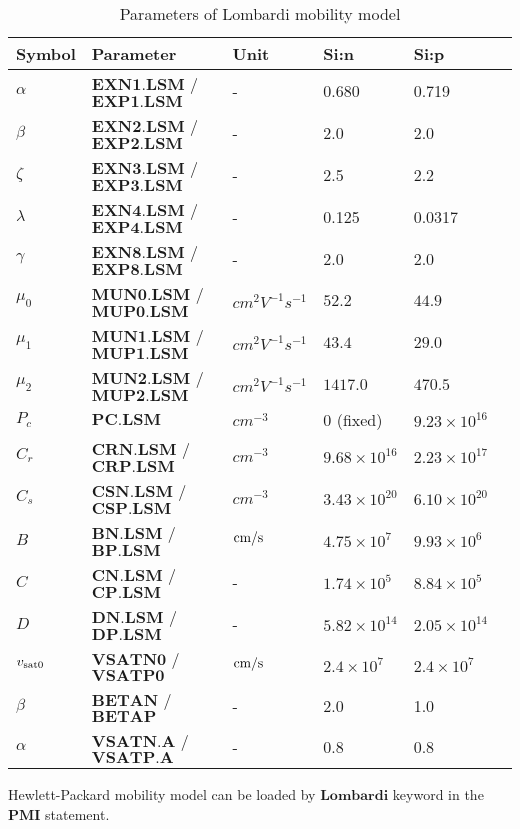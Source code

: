 \documentclass[oneside,12pt]{cgd_book}
\begin{document}
\begin{longtable}{llllll}
\caption{\label{tab:Equation:Mobility:Lombardi:Param}Parameters of Lombardi mobility model} \\
\hline
 Symbol
& Parameter
& Unit
& Si:n
& Si:p\\
\hline
 $\alpha$
& $\mathbf{EXN1.LSM}$ / $\mathbf{EXP1.LSM}$
& -
& 0.680
& 0.719
\\
 $\beta$
& $\mathbf{EXN2.LSM}$ / $\mathbf{EXP2.LSM}$
& -
& 2.0
& 2.0
\\
 $\zeta$
& $\mathbf{EXN3.LSM}$ / $\mathbf{EXP3.LSM}$
& -
& 2.5
& 2.2
\\
 $\lambda$
& $\mathbf{EXN4.LSM}$ / $\mathbf{EXP4.LSM}$
& -
& 0.125
& 0.0317
\\
 $\gamma$
& $\mathbf{EXN8.LSM}$ / $\mathbf{EXP8.LSM}$
& -
& 2.0
& 2.0
\\
 $\mu_0$
& $\mathbf{MUN0.LSM}$ / $\mathbf{MUP0.LSM}$
& $cm^2V^{-1}s^{-1}$
& $52.2$
& $44.9$
\\
 $\mu_1$
& $\mathbf{MUN1.LSM}$ / $\mathbf{MUP1.LSM}$
& $cm^2V^{-1}s^{-1}$
& $43.4$
& $29.0$
\\
 $\mu_2$
& $\mathbf{MUN2.LSM}$ / $\mathbf{MUP2.LSM}$
& $cm^2V^{-1}s^{-1}$
& $1417.0$
& $470.5$
\\
 $P_c$
& $\mathbf{PC.LSM}$
& $cm^{-3}$
& 0 (fixed)
& $9.23\times 10^{16}$
\\
 $C_r$
& $\mathbf{CRN.LSM}$ / $\mathbf{CRP.LSM}$
& $cm^{-3}$
& $9.68\times 10^{16}$
& $2.23\times 10^{17}$
\\
 $C_s$
& $\mathbf{CSN.LSM}$ / $\mathbf{CSP.LSM}$
& $cm^{-3}$
& $3.43\times 10^{20}$
& $6.10\times 10^{20}$
\\
 $B$
& $\mathbf{BN.LSM}$ / $\mathbf{BP.LSM}$
& $\text{cm}\text{/}\text{s}$
& $4.75\times 10^{7}$
& $9.93\times 10^{6}$
\\
 $C$
& $\mathbf{CN.LSM}$ / $\mathbf{CP.LSM}$
& -
& $1.74\times 10^{5}$
& $8.84\times 10^{5}$
\\
 $D$
& $\mathbf{DN.LSM}$ / $\mathbf{DP.LSM}$
& -
& $5.82\times 10^{14}$
& $2.05\times 10^{14}$
\\
 $v_{\rm sat0}$
& $\mathbf{VSATN0}$ / $\mathbf{VSATP0}$
& $\text{cm}\text{/}\text{s}$
& $2.4\times 10^7$
& $2.4\times 10^7$
\\
 $\beta$
& $\mathbf{BETAN}$ / $\mathbf{BETAP}$
& -
& 2.0
& 1.0
\\
 $\alpha$
& $\mathbf{VSATN.A}$ / $\mathbf{VSATP.A}$
& -
& 0.8
& 0.8\\
\end{longtable}
Hewlett-Packard mobility model can be loaded by $\mathbf{Lombardi}$
keyword in the $\mathbf{PMI}$ statement.
\par
\end{document}
